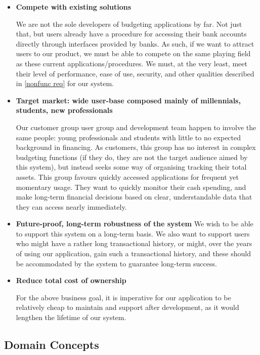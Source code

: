 \documentclass[11pt]{article}
\newcounter{use case ID}
\newcounter{req ID}
\begin{document}
\begin{itemize}
    \item \textbf{Compete with existing solutions}

    We are not the sole developers of budgeting applications by far. Not just that, but users already have a procedure for accessing their bank accounts directly through interfaces provided by banks. As such, if we want to attract users to our product, we must be able to compete on the same playing field as these current applications/procedures. We must, at the very least, meet their level of performance, ease of use, security, and other qualities described in \ref{nonfunc req} for our system.

    \item \textbf{Target market: wide user-base composed mainly of millennials, students, new professionals}

    Our customer group user group and development team happen to involve the same people: young professionals and students with little to no expected background in financing. As customers, this group has no interest in complex budgeting functions (if they do, they are not the target audience aimed by this system), but instead seeks some way of organising tracking their total assets. This group favours quickly accessed applications for frequent yet momentary usage. They want to quickly monitor their cash spending, and make long-term financial decisions based on clear, understandable data that they can access nearly immediately.

    \item \textbf{Future-proof, long-term robustness of the system} We wish to be able to support this system on a long-term basis. We also want to support users who might have a rather long transactional history, or might, over the years of using our application, gain such a transactional history, and these should be accommodated by the system to guarantee long-term success.

    \item \textbf{Reduce total cost of ownership}

    For the above business goal, it is imperative for our application to be relatively cheap to maintain and support after development, as it would lengthen the lifetime of our system.

\end{itemize}

\subsection{Domain Concepts}
\end{document}
